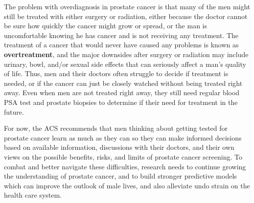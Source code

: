 The problem with overdiagnosis in prostate cancer is that many of the men might still be treated with either surgery or radiation, either because the doctor cannot be sure how quickly the cancer might grow or spread, or the man is uncomfortable knowing he has cancer and is not receiving any treatment. The treatment of a cancer that would never have caused any problems is known as \textbf{overtreatment}, and the major downsides after surgery or radiation may include urinary, bowl, and/or sexual side effects that can seriously affect a man's quality of life. Thus, men and their doctors often struggle to decide if treatment is needed, or if the cancer can just be closely watched without being treated right away. Even when men are not treated right away, they still need regular blood PSA test and prostate biopsies to determine if their need for treatment in the future. \par

For now, the ACS recommends that men thinking about getting tested for prostate cancer learn as much as they can so they can make informed decisions based on available information, discussions with their doctors, and their own views on the possible benefits, risks, and limits of prostate cancer screening. To combat and better navigate these difficulties, research needs to continue growing the understanding of prostate cancer, and to build stronger predictive models which can improve the outlook of male lives, and also alleviate undo strain on the health care system.





